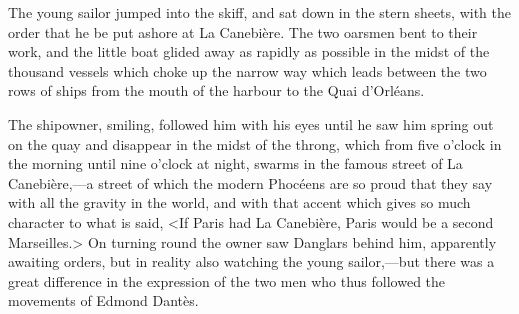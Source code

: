  The young sailor jumped into the skiff, and sat down in the stern sheets, with the order that he be put ashore at La Canebière. The two oarsmen bent to their work, and the little boat glided away as rapidly as possible in the midst of the thousand vessels which choke up the narrow way which leads between the two rows of ships from the mouth of the harbour to the Quai d'Orléans. 

 The shipowner, smiling, followed him with his eyes until he saw him spring out on the quay and disappear in the midst of the throng, which from five o'clock in the morning until nine o'clock at night, swarms in the famous street of La Canebière,—a street of which the modern Phocéens are so proud that they say with all the gravity in the world, and with that accent which gives so much character to what is said, <If Paris had La Canebière, Paris would be a second Marseilles.> On turning round the owner saw Danglars behind him, apparently awaiting orders, but in reality also watching the young sailor,—but there was a great difference in the expression of the two men who thus followed the movements of Edmond Dantès. 